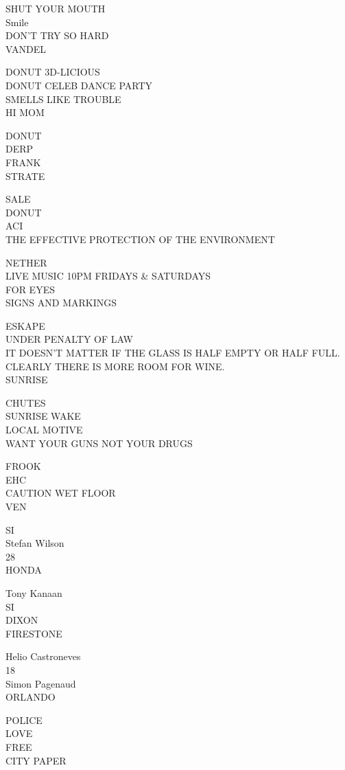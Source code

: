\documentclass[10pt,letterpaper]{article}
\begin{document}
SHUT YOUR MOUTH\\
Smile\\
DON'T TRY SO HARD\\
VANDEL

DONUT 3D{-}LICIOUS\\
DONUT CELEB DANCE PARTY\\
SMELLS LIKE TROUBLE\\
HI MOM

DONUT\\
DERP\\
FRANK\\
STRATE

SALE\\
DONUT\\
ACI\\
THE EFFECTIVE PROTECTION OF THE ENVIRONMENT

NETHER\\
LIVE MUSIC 10PM FRIDAYS \& SATURDAYS\\
FOR EYES\\
SIGNS AND MARKINGS

ESKAPE\\
UNDER PENALTY OF LAW\\
IT DOESN'T MATTER IF THE GLASS IS HALF EMPTY OR HALF FULL.  CLEARLY THERE IS MORE ROOM FOR WINE.\\
SUNRISE

CHUTES\\
SUNRISE WAKE\\
LOCAL MOTIVE\\
WANT YOUR GUNS NOT YOUR DRUGS

FROOK\\
EHC\\
CAUTION WET FLOOR\\
VEN

SI\\
Stefan Wilson\\
28\\
HONDA

Tony Kanaan\\
SI\\
DIXON\\
FIRESTONE

Helio Castroneves\\
18\\
Simon Pagenaud\\
ORLANDO

POLICE\\
LOVE\\
FREE\\
CITY PAPER
\end{document}
